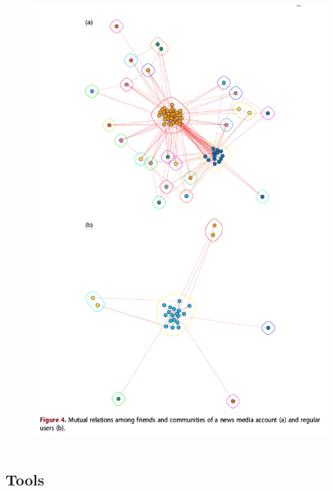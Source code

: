 \documentclass[serif, aspectratio=169]{beamer}
\begin{document}
\begin{frame}
\begin{columns}
\begin{column}{0.4\textwidth}
\begin{figure}
    \includegraphics{figure/paper_network}
\end{figure}
\end{column}

\end{columns}

\end{frame}

\subsection{Tools}
\end{document}

